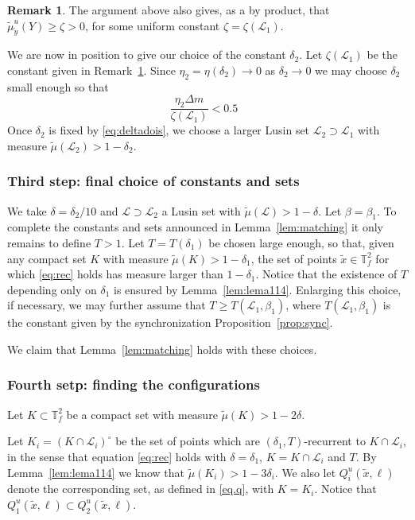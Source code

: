 \documentclass[a4paper,11pt,reqno]{amsart}
\newcommand{\TTf}{{\mathbb{T}_f^2}}
\newcommand{\cL}{{\mathcal L}}
\newcommand{\tix}{\tilde{x}}
\newcommand{\tm}{\tilde{\mu}}
\theoremstyle{definition}
\newtheorem{remark}{Remark}
\begin{document}
\begin{remark}
	\label{rem:malin}
The argument above also gives, as a by product, that $\tm^u_{\tilde{y}}(Y)\geq \zeta>0$, for some uniform constant $\zeta=\zeta(\cL_1)$.
\end{remark}

We are now in position to give our choice of the constant $\delta_2$. Let $\zeta(\cL_1)$ be the constant given in Remark~\ref{rem:malin}. Since $\eta_2=\eta(\delta_2)\to 0$ as $\delta_2\to 0$ we may choose $\delta_2$ small enough so that 
\begin{equation}
\label{eq:deltadois}
\frac{\eta_2\Delta m}{\zeta(\cL_1)}<0.5\:\:\:
\end{equation}
Once $\delta_2$ is fixed by \eqref{eq:deltadois}, we choose a larger Lusin set $\cL_2\supset\cL_1$ with measure $\tm(\cL_2)>1-\delta_2$.
\subsubsection{Third step: final choice of constants and sets}
We take $\delta=\delta_2/10$ and $\cL\supset\cL_2$ a Lusin set with $\tm(\cL)>1-\delta$. Let $\beta=\beta_1$. To complete the constants and sets announced in Lemma~\ref{lem:matching} it only remains to define $T>1$. Let $T=T(\delta_1)$ be chosen large enough, so that, given any compact set $K$ with measure $\tm(K)>1-\delta_1$, the set of points $\tix\in\TTf$ for which \eqref{eq:rec} holds has measure larger than  $1-\delta_1$. Notice that the existence of $T$ depending only on $\delta_1$ is ensured by Lemma~\ref{lem:lema114}. Enlarging this choice, if necessary, we may further assume that $T\geq T(\cL_1,\beta_1)$, where $T(\cL_1,\beta_1)$ is the constant given by the synchronization Proposition~\ref{prop:sync}.

We claim that Lemma~\ref{lem:matching} holds with these choices.
\subsubsection{Fourth setp: finding the configurations}
Let $K\subset\TTf$ be a compact set with measure $\tm(K)>1-2\delta$. 

Let $K_i=(K\cap\cL_i)^{\circ}$ be the set of points which are $(\delta_1,T)$-recurrent to $K\cap\cL_i$, in the sense that equation \eqref{eq:rec} holds with $\delta=\delta_1$, $K=K\cap\cL_i$ and $T$. By Lemma~\ref{lem:lema114} we know that $\tm(K_i)>1-3\delta_i$. We also let $Q^u_i(\tix,\ell)$ denote the corresponding set, as defined in \eqref{eq.q}, with $K=K_i$. Notice that $Q^u_1(\tix,\ell)\subset Q^u_2(\tix,\ell)$.
\end{document}
